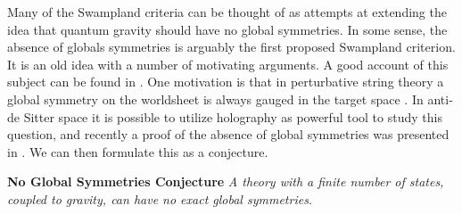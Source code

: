 \documentclass[11pt,a4paper]{article}
\numberwithin{equation}{section}
\numberwithin{table}{section}\setlength{\multlinegap}{25pt}
\begin{document}
Many of the Swampland criteria can be thought of as attempts at extending the idea that quantum gravity should have no global symmetries. In some sense, the absence of globals symmetries is arguably the first proposed Swampland criterion. It is an old idea with a number of motivating arguments. A good account of this subject can be found in \cite{Banks:2010zn}. One motivation is that in perturbative string theory a global symmetry on the worldsheet is always gauged in the target space \cite{Banks:1988yz}. In anti-de Sitter space it is possible to utilize holography as powerful tool to study this question, and recently a proof of the absence of global symmetries was presented in \cite{Harlow:2018tng,Harlow:2018jwu}. We can then formulate this as a conjecture.

\begin{tcolorbox}
{\bf No Global Symmetries Conjecture} \;\cite{Banks:1988yz,Banks:2010zn}
\newline
\newline
{\it 
A theory with a finite number of states, coupled to gravity, can have no exact global symmetries. 
}
\end{tcolorbox}
\end{document}

